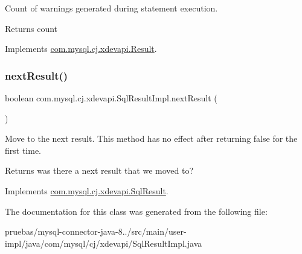 Count of warnings generated during statement execution.

\begin{DoxyReturn}{Returns}
count 
\end{DoxyReturn}


Implements \mbox{\hyperlink{interfacecom_1_1mysql_1_1cj_1_1xdevapi_1_1_result_addd5c82af4ab35e702d7f2961119ecc6}{com.\+mysql.\+cj.\+xdevapi.\+Result}}.

\mbox{\label{classcom_1_1mysql_1_1cj_1_1xdevapi_1_1_sql_result_impl_a63d1fa4f9bdb44615cb07d3324e96341}} 
\subsubsection{\texorpdfstring{next\+Result()}{nextResult()}}
{\footnotesize\ttfamily boolean com.\+mysql.\+cj.\+xdevapi.\+Sql\+Result\+Impl.\+next\+Result (\begin{DoxyParamCaption}{ }\end{DoxyParamCaption})}

Move to the next result. This method has no effect after returning {\ttfamily false} for the first time.

\begin{DoxyReturn}{Returns}
was there a next result that we moved to? 
\end{DoxyReturn}


Implements \mbox{\hyperlink{interfacecom_1_1mysql_1_1cj_1_1xdevapi_1_1_sql_result_ad5c821bd2efe2e952aef48dc574e913d}{com.\+mysql.\+cj.\+xdevapi.\+Sql\+Result}}.



The documentation for this class was generated from the following file\+:\begin{DoxyCompactItemize}
\item 
pruebas/mysql-\/connector-\/java-\/8../src/main/user-\/impl/java/com/mysql/cj/xdevapi/Sql\+Result\+Impl.\+java\end{DoxyCompactItemize}
